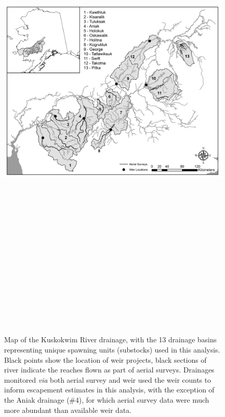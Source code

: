 \documentclass[12pt,]{book}
\theoremstyle{definition}
\theoremstyle{definition}
\theoremstyle{definition}
\theoremstyle{remark}
\begin{document}
\clearpage

\begin{landscape}
\begin{figure}
  \centering
  \captionsetup{width=1.5\textwidth}
  \includegraphics[height = 25cm]{img/Ch4/ch4-map.jpg}
  \caption{Map of the Kuskokwim River drainage, with the 13 drainage basins representing unique spawning units (substocks) used in this analysis. Black points show the location of weir projects, black sections of river indicate the reaches flown as part of aerial surveys. Drainages monitored \textit{via} both aerial survey and weir used the weir counts to inform escapement estimates in this analysis, with the exception of the Aniak drainage (\#4), for which aerial survey data were much more abundant than available weir data.}
  \label{fig:ch4-map}
\end{figure}
\end{landscape}
\end{document}

